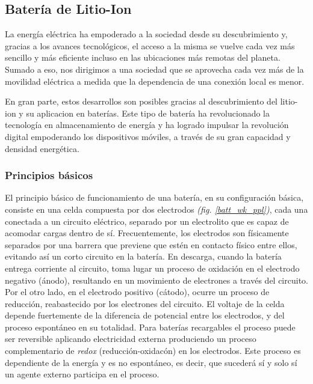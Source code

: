 \documentclass[10pt,a4paper]{article}
\begin{document}
\subsection{Batería de Litio-Ion}

La energía eléctrica ha empoderado a la sociedad desde su descubrimiento y,
gracias a los avances tecnológicos, el acceso a la misma se vuelve cada vez más
sencillo y más eficiente incluso en las ubicaciones más remotas del planeta.
Sumado a eso, nos dirigimos a una sociedad que se aprovecha cada vez más de la
movilidad eléctrica a medida que la dependencia de una conexi\'on local es
menor.

En gran parte, estos desarrollos son posibles gracias al descubrimiento del
litio-ion y su aplicacion en baterías. Este tipo de batería ha revolucionado la
tecnolog\'ia en almacenamiento de energ\'ia y ha logrado impulsar la
revoluci\'on digital empoderando los dispositivos móviles, a trav\'es de su gran
capacidad y densidad energ\'etica.

\subsubsection{Principios b\'asicos}

El principio básico de funcionamiento de una batería, en su configuraci\'on
b\'asica, consiste en una celda compuesta por dos electrodos 
\emph{(fig. \ref{batt_wk_ppl})}, cada una conectada a un circuito el\'ectrico, 
separado por un electrolito que es capaz de acomodar cargas dentro de sí. 
Frecuentemente, los electrodos son f\'isicamente separados por una barrera que 
previene que estén en contacto físico entre ellos, evitando así un corto 
circuito en la batería. En descarga, cuando la bater\'ia entrega corriente al 
circuito, toma lugar un proceso de oxidación en el electrodo negativo (\'anodo), 
resultando en un movimiento de electrones a trav\'es del circuito. Por el otro 
lado, en el electrodo positivo (c\'atodo), ocurre un proceso de reducción, 
reabastecido por los electrones del circuito. El voltaje de la celda depende 
fuertemente de la diferencia de potencial entre los electrodos, y del proceso 
espont\'aneo en su totalidad. Para baterías recargables el proceso puede ser 
reversible aplicando electricidad externa produciendo un proceso complementario 
de \emph{redox} (reducci\'on-oxidac\'on) en los electrodos. Este proceso es 
dependiente de la energ\'ia y es no espont\'aneo, es decir, que sucederá s\'i y 
solo s\'i un agente externo participa en el proceso.
\end{document}
